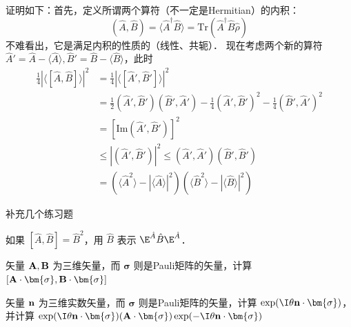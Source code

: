 证明如下：首先，定义所谓两个算符（不一定是Hermitian）的内积：
\begin{equation}
(\hat A, \hat B)=\langle\hat A^\dagger\hat B\rangle = \text{Tr}(\hat A^\dagger\hat B\hat\rho)
\end{equation}
不难看出，它是满足内积的性质的（线性、共轭）．
现在考虑两个新的算符 $\hat A'=\hat A-\langle\hat A\rangle, \hat B'=\hat B-\langle\hat B\rangle$，此时
\begin{equation}
\begin{split}
\frac{1}{4}|\langle[\hat A,\hat B]\rangle|^2&=\frac{1}{4}|\langle[\hat A',\hat B']\rangle|^2 \\
&=\frac{1}{2}(\hat A',\hat B')(\hat B',\hat A')-\frac{1}{4}(\hat A',\hat B')^2-\frac{1}{4}(\hat B',\hat A')^2\\
&=[\text{Im}(\hat A',\hat B')]^2\\
&\le |(\hat A',\hat B')|^2\le(\hat A',\hat A')(\hat B',\hat B')\\
&=(\langle\hat A^2\rangle - |\langle\hat A\rangle|^2)(\langle\hat B^2\rangle - |\langle\hat B\rangle|^2)
\end{split}
\end{equation}

补充几个练习题

\begin{exer}{}
如果 $[\hat A,\hat B]=\hat B^2$，用 $\hat B$ 表示 $\E^{\hat A}\hat B \E^{\hat A}$．
\end{exer}

\begin{exer}{}
矢量 $\bf A, B$ 为三维矢量，而 $\bm{\sigma}$ 则是Pauli矩阵的矢量，计算 $[\bf A\cdot\bm{\sigma}, B\cdot\bm{\sigma}]$
\end{exer}{}

\begin{exer}{}
矢量 $\bf n$ 为三维实数矢量，而 $\bm{\sigma}$ 则是Pauli矩阵的矢量，计算 $\exp(\I\theta\bf n\cdot\bm{\sigma})$，并计算 $\exp(\I\theta\bf n\cdot\bm{\sigma})(\bf A\cdot\bm{\sigma})\exp(-\I\theta\bf n\cdot\bm{\sigma})$
\end{exer}